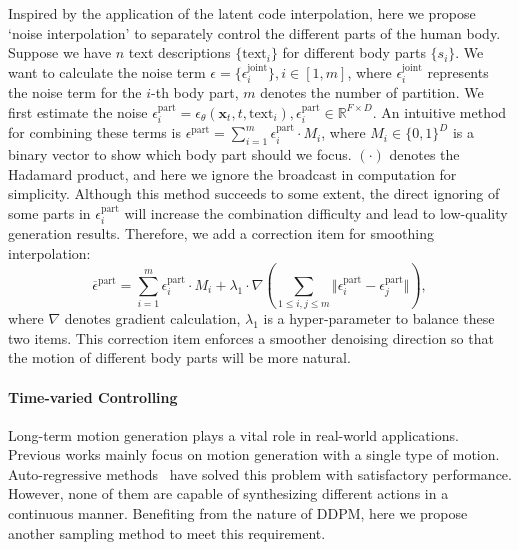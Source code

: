 Inspired by the application of the latent code interpolation, here we propose `noise interpolation' to separately control the different parts of the human body. Suppose we have $n$ text descriptions $\{\textrm{text}_i\}$ for different body parts $\{s_i\}$. We want to calculate the noise term $\epsilon=\{\epsilon^{\textrm{joint}}_i\}, i \in [1, m]$, where $\epsilon^{\textrm{joint}}_i$ represents the noise term for the $i$-th body part, $m$ denotes the number of partition. We first estimate the noise $\epsilon^{\textrm{part}}_i=\epsilon_{\theta}(\mathbf{x}_t,t,\textrm{text}_i), \epsilon^{\textrm{part}}_i \in \mathbb{R}^{F \times D}$. An intuitive method for combining these terms is $\epsilon^{\textrm{part}}=\sum_{i=1}^m \epsilon^{\textrm{part}}_i \cdot M_{i}$, where $M_i \in \{0,1\}^D$ is a binary vector to show which body part should we focus. $(\cdot)$ denotes the Hadamard product, and here we ignore the broadcast in computation for simplicity. Although this method succeeds to some extent, the direct ignoring of some parts in $\epsilon^{\textrm{part}}_i$ will increase the combination difficulty and lead to low-quality generation results. Therefore, we add a correction item for smoothing interpolation:
\begin{equation}
\overline{\epsilon}^{\textrm{part}}=\sum_{i=1}^m \epsilon^{\textrm{part}}_i \cdot M_{i} + \lambda_1 \cdot \nabla ( \sum\limits_{1 \leq i,j \leq m} \Vert \epsilon^{\textrm{part}}_i - \epsilon^{\textrm{part}}_j  \Vert),
\end{equation}
where $\nabla$ denotes gradient calculation, $\lambda_1$ is a hyper-parameter to balance these two items. This correction item enforces a smoother denoising direction so that the motion of different body parts will be more natural.

\paragraph{Time-varied Controlling} Long-term motion generation plays a vital role in real-world applications. Previous works mainly focus on motion generation with a single type of motion. Auto-regressive methods~\citep{henter2020moglow,guo2022generating} have solved this problem with satisfactory performance. However, none of them are capable of synthesizing different actions in a continuous manner. Benefiting from the nature of DDPM, here we propose another sampling method to meet this requirement.


